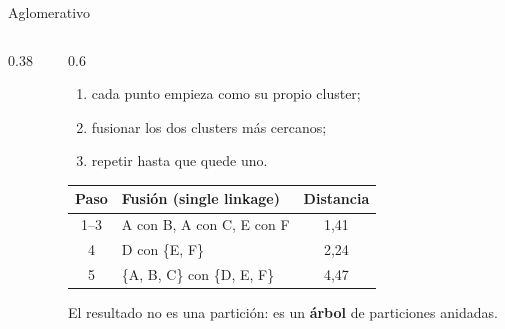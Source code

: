\documentclass[aspectratio=169,12pt]{beamer}
\newcommand{\hrow}{\rowcolor{mlcream}}
\newcommand{\miniaxes}{%
  \draw[step=1,mlgray!25,very thin] (0,0) grid (9,8);
  \draw[-{Stealth},mlgray] (0,0) -- (9.3,0); \draw[-{Stealth},mlgray] (0,0) -- (0,8.3);}
\begin{document}
\begin{frame}{Aglomerativo}
  \begin{columns}[c]
    \begin{column}{0.38\textwidth}
      \centering
    \end{column}
    \begin{column}{0.6\textwidth}
      \small
      \begin{enumerate}
        \item cada punto empieza como su propio cluster;
        \item fusionar los dos clusters más cercanos;
        \item repetir hasta que quede uno.
      \end{enumerate}
      \footnotesize
      \begin{tabular}{@{}c l c@{}}
        \toprule
        \hrow \textbf{Paso} & \textbf{Fusión (single linkage)} & \textbf{Distancia} \\
        \midrule
        1--3 & A con B, A con C, E con F & 1,41 \\
        4 & D con \{E, F\} & 2,24 \\
        5 & \{A, B, C\} con \{D, E, F\} & 4,47 \\
        \bottomrule
      \end{tabular}
      \vspace{4pt}

      \small El resultado no es una partición: es un \textbf{árbol} de particiones anidadas.
    \end{column}
  \end{columns}
\end{frame}
\end{document}
